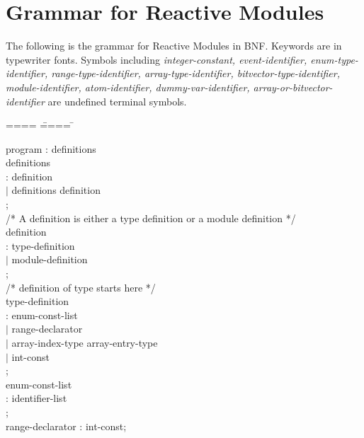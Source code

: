\chapter{Grammar for Reactive Modules}
\label{chap:grammar}
The following is the grammar for Reactive Modules in BNF. Keywords are 
in typewriter fonts. Symbols including {\it 
integer-constant, 
event-identifier,
enum-type-identifier, 
range-type-identifier,
array-type-identifier,
bitvector-type-identifier,
module-identifier,
atom-identifier,
dummy-var-identifier,
array-or-bitvector-identifier
} are undefined terminal symbols.

\begin{tab}
\begin{tabbing}

==== \= ==== \= \kill

program : definitions \\

definitions  \\
\>: definition \\
\>$|$ definitions definition \\
\>; \\

/* A definition is either a type definition or a module definition */ \\

definition  \\
\> : type-definition \\
\> $|$ module-definition \\
\> ; \\

/* definition of type starts here */ \\
type-definition  \\
\>: \TYPEDEF \ENUMID \COLON enum-const-list \\
\>$|$ \TYPEDEF \RANGEID \COLON range-declarator \\
\>$|$ \TYPEDEF \ARRAYID \COLON \ARRAY array-index-type \OF array-entry-type \\
\>$|$ \TYPEDEF \BITVECID \COLON \BITVECTOR int-const \\
\>; \\

enum-const-list  \\
\>: \LBRACE identifier-list \RBRACE \\
\>; \\

range-declarator : int-const\RPARA; \\


\end{tabbing}
\end{tab}
